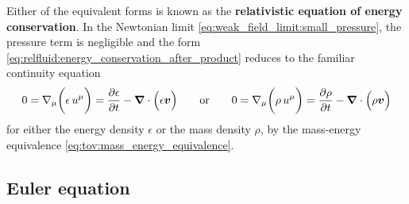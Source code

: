Either of the equivalent forms is known as the \textbf{relativistic equation of energy conservation}.
In the Newtonian limit \eqref{eq:weak_field_limit:small_pressure}, the pressure term is negligible and the form \eqref{eq:relfluid:energy_conservation_after_product} reduces to the familiar continuity equation
\cite[equation 7.1]{ref:iver}
\begin{equation}
	0 = \nabla_\mu \bigg( \epsilon \, u^\mu \bigg) = \pdv{\epsilon}{t} - {\bm{\nabla}} \cdot \Big( \epsilon {\bm{v}} \Big)
	\qquad \text{or} \qquad
	0 = \nabla_\mu \bigg( \rho \, u^\mu \bigg) = \pdv{\rho}{t} - {\bm{\nabla}} \cdot \Big( \rho {\bm{v}} \Big)
\end{equation}
for either the energy density $\epsilon$ or the mass density $\rho$, by the mass-energy equivalence \eqref{eq:tov:mass_energy_equivalence}.

\iffalse
It is useful to have the Euler equation in a form that involves derivatives $\odv{}/{\tau} = u^\mu \nabla_\mu$ along a streamline.
By repeated application of the product rule and substitution of baryon number conservation \eqref{eq:relfluid:baryon_number_rate_change}, we can rewrite \eqref{eq:relfluid:energy_conservation} as
\begin{equation}
\begin{aligned}
	0 &= u^\mu \nabla_\mu \epsilon + (\epsilon+P) \nabla_\mu u^\mu      && \qquad \text{(by product rule)} \\
	  &= \odv{\epsilon}{\tau} + (\epsilon+P) \nabla_\mu u^\mu           && \qquad \text{(by backwards chain rule)} \\
	  &= \odv{\epsilon}{\tau} + \frac{\epsilon+P}{n} n \nabla_\mu u^\mu &&                             \\
	  &= \odv{\epsilon}{\tau} - \frac{\epsilon+P}{n} u^\mu \nabla_\mu n && \qquad \text{(by product rule and \eqref{eq:relfluid:baryon_number_divergence})} \\
	  &= \odv{\epsilon}{\tau} - \frac{\epsilon+P}{n} \odv{n}{\tau} .    && \qquad \text{(by backwards chain rule)} \\
	  &= \odv{\epsilon}{\tau} + \left( \epsilon + P \right) \nabla_\mu u^\mu
\end{aligned}
\label{eq:relfluid:energy_conservation_rewritten}
\end{equation}
This is in the form we wanted.
\fi

\subsection{Euler equation}

